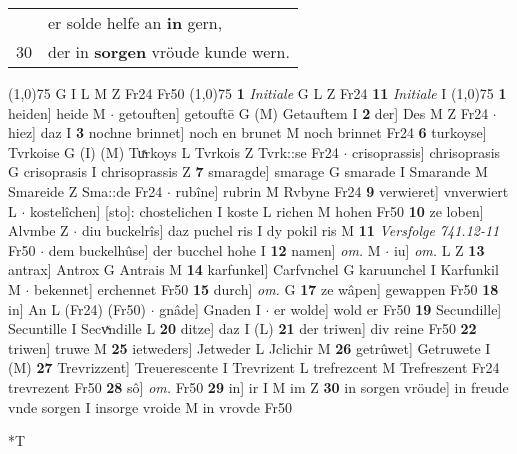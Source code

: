 \documentclass[8pt,a4paper,notitlepage]{article}
\begin{document}
\begin{table}[ht]
\begin{minipage}[t]{0.5\linewidth}
\begin{tabular}{rl}
 & er solde helfe an \textbf{in} gern,\\ 
30 & der in \textbf{sorgen} vröude kunde wern.\\ 
\end{tabular}
\scriptsize
\line(1,0){75} \newline
G I L M Z Fr24 Fr50 \newline
\line(1,0){75} \newline
\textbf{1} \textit{Initiale} G L Z Fr24  \textbf{11} \textit{Initiale} I  \newline
\line(1,0){75} \newline
\textbf{1} heiden] heide M  $\cdot$ getouften] getouftē G (M) Getauftem I \textbf{2} der] Des M Z Fr24  $\cdot$ hiez] daz I \textbf{3} nochne brinnet] noch en brunet M noch brinnet Fr24 \textbf{6} turkoyse] Tvrkoise G (I) (M) Tuͯrkoys L Tvrkois Z Tvrk::se Fr24  $\cdot$ crisoprassis] chrisoprasis G crisoprasis I chrisoprassis Z \textbf{7} smaragde] smarage G smarade I Smarande M Smareide Z Sma::de Fr24  $\cdot$ rubîne] rubrin M Rvbyne Fr24 \textbf{9} verwieret] vnverwiert L  $\cdot$ kostelîchen] [sto]: chostelichen I koste L richen M hohen Fr50 \textbf{10} ze loben] Alvmbe Z  $\cdot$ diu buckelrîs] daz puchel ris I dy pokil ris M \textbf{11} \textit{Versfolge 741.12-11} Fr50   $\cdot$ dem buckelhûse] der bucchel hohe I \textbf{12} namen] \textit{om.} M  $\cdot$ iu] \textit{om.} L Z \textbf{13} antrax] Antrox G Antrais M \textbf{14} karfunkel] Carfvnchel G karuunchel I Karfunkil M  $\cdot$ bekennet] erchennet Fr50 \textbf{15} durch] \textit{om.} G \textbf{17} ze wâpen] gewappen Fr50 \textbf{18} in] An L (Fr24) (Fr50)  $\cdot$ gnâde] Gnaden I  $\cdot$ er wolde] wold er Fr50 \textbf{19} Secundille] Secuntille I Secvͯndille L \textbf{20} ditze] daz I (L) \textbf{21} der triwen] div reine Fr50 \textbf{22} triwen] truwe M \textbf{25} ietweders] Jetweder L Jclichir M \textbf{26} getrûwet] Getruwete I (M) \textbf{27} Trevrizzent] Treuerescente I Trevrizent L trefrezcent M Trefreszent Fr24 trevrezent Fr50 \textbf{28} sô] \textit{om.} Fr50 \textbf{29} in] ir I M im Z \textbf{30} in sorgen vröude] in freude vnde sorgen I insorge vroide M in vrovde Fr50 \newline
\end{minipage}
\hspace{0.5cm}
\begin{minipage}[t]{0.5\linewidth}
\small
\begin{center}*T
\end{center}
\begin{tabular}{rl}

\end{tabular}
\end{minipage}
\end{table}
\end{document}
